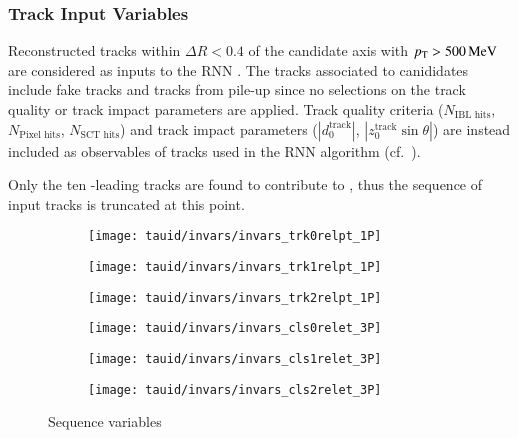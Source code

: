 

\subsubsection{Track Input Variables}

Reconstructed tracks within $\Delta R < 0.4$ of the \tauhadvis
candidate axis with $p_{\text{T}} > \SI{500}{\ensuremath{\text{MeV}}}$ are considered as inputs to
the RNN \tauid. The tracks associated to \tauhadvis canididates
include fake tracks and tracks from pile-up since no selections on the
track quality or track impact parameters are applied. Track quality
criteria ($N_{\text{IBL hits}}$, $N_{\text{Pixel hits}}$,
$N_{\text{SCT hits}}$) and track impact parameters
($|d_0^{\text{track}}|$, $|z_0^{\text{track}} \sin\theta|$) are
instead included as observables of tracks used in the RNN \tauid
algorithm (cf.~).


Only the ten \pT-leading tracks are found to contribute to \tauid,
thus the sequence of input tracks is truncated at this point.

\begin{figure}[htbp]
  \centering

  \begin{subfigure}{0.33\textwidth}
    \texttt{[image: tauid/invars/invars\_trk0relpt\_1P]}
    \subcaption{}
  \end{subfigure}%
  \begin{subfigure}{0.33\textwidth}
    \texttt{[image: tauid/invars/invars\_trk1relpt\_1P]}
    \subcaption{}
  \end{subfigure}%
  \begin{subfigure}{0.33\textwidth}
    \texttt{[image: tauid/invars/invars\_trk2relpt\_1P]}
    \subcaption{}
  \end{subfigure}

  \begin{subfigure}{0.33\textwidth}
    \texttt{[image: tauid/invars/invars\_cls0relet\_3P]}
    \subcaption{}
  \end{subfigure}%
  \begin{subfigure}{0.33\textwidth}
    \texttt{[image: tauid/invars/invars\_cls1relet\_3P]}
    \subcaption{}
  \end{subfigure}%
  \begin{subfigure}{0.33\textwidth}
    \texttt{[image: tauid/invars/invars\_cls2relet\_3P]}
    \subcaption{}
  \end{subfigure}

  \caption{Sequence variables}%
  \label{fig:tauid_low_level_variables}
\end{figure}

